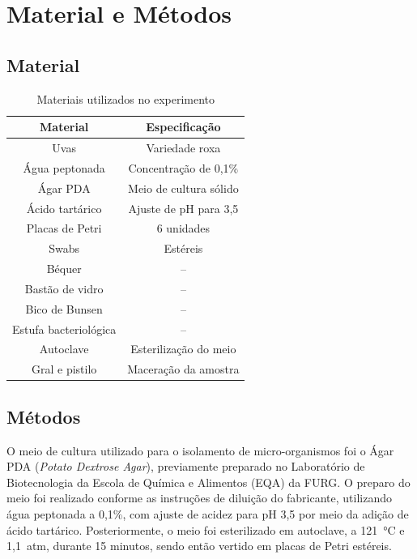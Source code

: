 \section{Material e Métodos}

\subsection{Material}

\begin{table}[H]
\caption{Materiais utilizados no experimento}
\centering
\begin{tabular}{cc}
\toprule
\textbf{Material} & \textbf{Especificação} \\
\midrule
Uvas                  & Variedade roxa \\
Água peptonada        & Concentração de 0,1\% \\
Ágar PDA              & Meio de cultura sólido \\
Ácido tartárico       & Ajuste de pH para 3,5 \\
Placas de Petri       & 6 unidades \\
Swabs                 & Estéreis \\
Béquer                & -- \\
Bastão de vidro       & -- \\
Bico de Bunsen        & -- \\
Estufa bacteriológica & -- \\
Autoclave             & Esterilização do meio \\
Gral e pistilo        & Maceração da amostra \\
\bottomrule
\end{tabular}
\end{table}

\subsection{Métodos}

O meio de cultura utilizado para o isolamento de micro-organismos foi o Ágar PDA (\textit{Potato Dextrose Agar}), previamente preparado no Laboratório de Biotecnologia da Escola de Química e Alimentos (EQA) da FURG. O preparo do meio foi realizado conforme as instruções de diluição do fabricante, utilizando água peptonada a 0,1\%, com ajuste de acidez para pH 3,5 por meio da adição de ácido tartárico. Posteriormente, o meio foi esterilizado em autoclave, a 121~°C e 1,1~atm, durante 15 minutos, sendo então vertido em placas de Petri estéreis.

